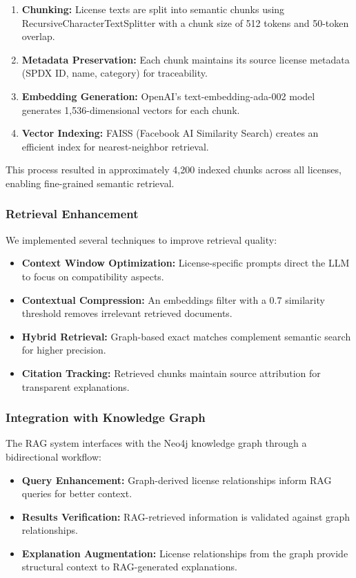 \documentclass[12pt]{article}
\begin{document}
\begin{enumerate}
    \item \textbf{Chunking:} License texts are split into semantic chunks using RecursiveCharacterTextSplitter with a chunk size of 512 tokens and 50-token overlap.
    \item \textbf{Metadata Preservation:} Each chunk maintains its source license metadata (SPDX ID, name, category) for traceability.
    \item \textbf{Embedding Generation:} OpenAI's text-embedding-ada-002 model generates 1,536-dimensional vectors for each chunk.
    \item \textbf{Vector Indexing:} FAISS (Facebook AI Similarity Search) creates an efficient index for nearest-neighbor retrieval.
\end{enumerate}

This process resulted in approximately 4,200 indexed chunks across all licenses, enabling fine-grained semantic retrieval.

\subsubsection{Retrieval Enhancement}
We implemented several techniques to improve retrieval quality:

\begin{itemize}
    \item \textbf{Context Window Optimization:} License-specific prompts direct the LLM to focus on compatibility aspects.
    \item \textbf{Contextual Compression:} An embeddings filter with a 0.7 similarity threshold removes irrelevant retrieved documents.
    \item \textbf{Hybrid Retrieval:} Graph-based exact matches complement semantic search for higher precision.
    \item \textbf{Citation Tracking:} Retrieved chunks maintain source attribution for transparent explanations.
\end{itemize}

\subsubsection{Integration with Knowledge Graph}
The RAG system interfaces with the Neo4j knowledge graph through a bidirectional workflow:

\begin{itemize}
    \item \textbf{Query Enhancement:} Graph-derived license relationships inform RAG queries for better context.
    \item \textbf{Results Verification:} RAG-retrieved information is validated against graph relationships.
    \item \textbf{Explanation Augmentation:} License relationships from the graph provide structural context to RAG-generated explanations.
\end{itemize}
\end{document}
